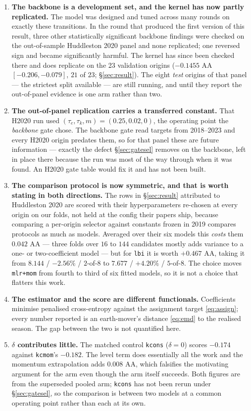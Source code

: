 \documentclass[11pt]{article}
\theoremstyle{remark}
\newcommand{\1}{\mathbf{1}}
\begin{document}
\begin{enumerate}
\item \textbf{The backbone is a development set, and the kernel has now partly
replicated.} The model was designed and tuned across many rounds on exactly these
transitions. In the round that produced the first version of this result, three other
statistically significant backbone findings were checked on the out-of-sample Huddleston
2020 panel and none replicated; one reversed sign and became significantly harmful. The
kernel has since been checked there and does replicate on the 23 validation origins
($-0.1455$ AA $[-0.206, -0.079]$, $21$ of $23$; \S\ref{sec:result}). The eight
\emph{test} origins of that panel --- the strictest split available --- are still running,
and until they report the out-of-panel evidence is one arm rather than two.

\item \textbf{The out-of-panel replication carries a transferred constant.} That H2020 run
used $(\tau_e, \tau_k, m) = (0.25, 0.02, 0)$, the operating point the \emph{backbone} gate
chose. The backbone gate read targets from 2018--2023 and every H2020 origin predates them,
so for that panel these are future information --- exactly the defect \S\ref{sec:gatesel}
removes on the backbone, left in place there because the run was most of the way through
when it was found. An H2020 gate table would fix it and has not been built.

\item \textbf{The comparison protocol is now symmetric, and that is worth stating in both
directions.} The rows in \S\ref{sec:result} attributed to Huddleston 2020 are scored with
their hyperparameters re-chosen at every origin on our folds, not held at the config their
papers ship, because comparing a per-origin selector against constants frozen in 2019
compares protocols as much as models. Averaged over their six models this \emph{costs}
them $0.042$ AA --- three folds over $16$ to $144$ candidates mostly adds variance to a
one- or two-coefficient model --- but for \texttt{lbi} it is worth $+0.467$ AA, taking it
from $8.144$ / $-2.56\%$ / $2$-of-$8$ to $7.677$ / $+4.20\%$ / $5$-of-$8$. The choice moves
\texttt{mlr+mom} from fourth to third of six fitted models, so it is not a choice that
flatters this work.

\item \textbf{The estimator and the score are different functionals.} Coefficients
minimise penalised cross-entropy against the assignment target \eqref{eq:assign}; every
number reported is an earth-mover's distance \eqref{eq:emd} to the realised season. The
gap between the two is not quantified here.

\item \textbf{$\delta$ contributes little.} The matched control \texttt{kcons}
($\delta = 0$) scores $-0.174$ against \texttt{kcmom}'s $-0.182$. The level term does
essentially all the work and the momentum extrapolation adds $0.008$ AA, which falsifies
the motivating argument for the arm even though the arm itself succeeds. Both figures are
from the superseded pooled arm; \texttt{kcons} has not been rerun under
\S\ref{sec:gatesel}, so the comparison is between two models at a common operating point
rather than each at its own.
\end{enumerate}
\end{document}
